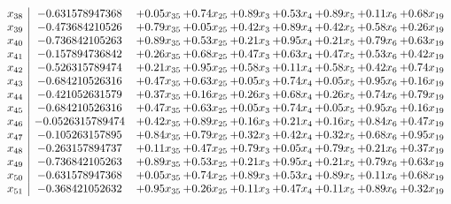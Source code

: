 \documentclass[8pt]{article}
\begin{document}
\[\begin{array}{c| c c@{\hskip 2pt} c@{\hskip 2pt} c@{\hskip 2pt} c@{\hskip 2pt} c@{\hskip 2pt} c@{\hskip 2pt} c@{\hskip 2pt} }
 x_{38}   &  -0.631578947368 & +  0.05 x_{35} & +  0.74 x_{25} & +  0.89 x_{3} & +  0.53 x_{4} & +  0.89 x_{5} & +  0.11 x_{6} & +  0.68 x_{19}\\
 x_{39}   &  -0.473684210526 & +  0.79 x_{35} & +  0.05 x_{25} & +  0.42 x_{3} & +  0.89 x_{4} & +  0.42 x_{5} & +  0.58 x_{6} & +  0.26 x_{19}\\
 x_{40}   &  -0.736842105263 & +  0.89 x_{35} & +  0.53 x_{25} & +  0.21 x_{3} & +  0.95 x_{4} & +  0.21 x_{5} & +  0.79 x_{6} & +  0.63 x_{19}\\
 x_{41}   &  -0.157894736842 & +  0.26 x_{35} & +  0.68 x_{25} & +  0.47 x_{3} & +  0.63 x_{4} & +  0.47 x_{5} & +  0.53 x_{6} & +  0.42 x_{19}\\
 x_{42}   &  -0.526315789474 & +  0.21 x_{35} & +  0.95 x_{25} & +  0.58 x_{3} & +  0.11 x_{4} & +  0.58 x_{5} & +  0.42 x_{6} & +  0.74 x_{19}\\
 x_{43}   &  -0.684210526316 & +  0.47 x_{35} & +  0.63 x_{25} & +  0.05 x_{3} & +  0.74 x_{4} & +  0.05 x_{5} & +  0.95 x_{6} & +  0.16 x_{19}\\
 x_{44}   &  -0.421052631579 & +  0.37 x_{35} & +  0.16 x_{25} & +  0.26 x_{3} & +  0.68 x_{4} & +  0.26 x_{5} & +  0.74 x_{6} & +  0.79 x_{19}\\
 x_{45}   &  -0.684210526316 & +  0.47 x_{35} & +  0.63 x_{25} & +  0.05 x_{3} & +  0.74 x_{4} & +  0.05 x_{5} & +  0.95 x_{6} & +  0.16 x_{19}\\
 x_{46}   &  -0.0526315789474 & +  0.42 x_{35} & +  0.89 x_{25} & +  0.16 x_{3} & +  0.21 x_{4} & +  0.16 x_{5} & +  0.84 x_{6} & +  0.47 x_{19}\\
 x_{47}   &  -0.105263157895 & +  0.84 x_{35} & +  0.79 x_{25} & +  0.32 x_{3} & +  0.42 x_{4} & +  0.32 x_{5} & +  0.68 x_{6} & +  0.95 x_{19}\\
 x_{48}   &  -0.263157894737 & +  0.11 x_{35} & +  0.47 x_{25} & +  0.79 x_{3} & +  0.05 x_{4} & +  0.79 x_{5} & +  0.21 x_{6} & +  0.37 x_{19}\\
 x_{49}   &  -0.736842105263 & +  0.89 x_{35} & +  0.53 x_{25} & +  0.21 x_{3} & +  0.95 x_{4} & +  0.21 x_{5} & +  0.79 x_{6} & +  0.63 x_{19}\\
 x_{50}   &  -0.631578947368 & +  0.05 x_{35} & +  0.74 x_{25} & +  0.89 x_{3} & +  0.53 x_{4} & +  0.89 x_{5} & +  0.11 x_{6} & +  0.68 x_{19}\\
 x_{51}   &  -0.368421052632 & +  0.95 x_{35} & +  0.26 x_{25} & +  0.11 x_{3} & +  0.47 x_{4} & +  0.11 x_{5} & +  0.89 x_{6} & +  0.32 x_{19}\\

\end{array}\]
\end{document}
